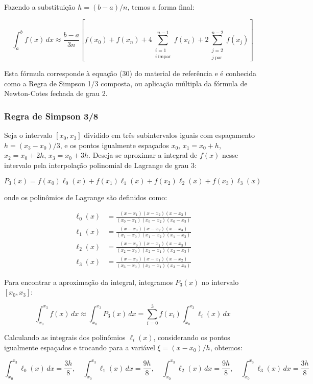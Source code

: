 \documentclass[12pt]{article}
\begin{document}
Fazendo a substituição $h = (b - a)/n$, temos a forma final:

\[
\int_a^b f(x)\,dx \approx \frac{b - a}{3n} \left[
f(x_0) + f(x_n)
+ 4 \sum_{\substack{i = 1 \\ i\ \text{ímpar}}}^{n-1} f(x_i)
+ 2 \sum_{\substack{j = 2 \\ j\ \text{par}}}^{n-2} f(x_j)
\right]
\]

Esta fórmula corresponde à equação (30) do material de referência e é conhecida como a Regra de Simpson 1/3 composta, ou aplicação múltipla da fórmula de Newton-Cotes fechada de grau 2.

\subsubsection*{Regra de Simpson 3/8}

Seja o intervalo $[x_0, x_3]$ dividido em três subintervalos iguais com espaçamento $h = (x_3 - x_0)/3$, e os pontos igualmente espaçados $x_0$, $x_1 = x_0 + h$, $x_2 = x_0 + 2h$, $x_3 = x_0 + 3h$. Deseja-se aproximar a integral de $f(x)$ nesse intervalo pela interpolação polinomial de Lagrange de grau 3:

\[
P_3(x) = f(x_0) \ell_0(x) + f(x_1) \ell_1(x) + f(x_2) \ell_2(x) + f(x_3) \ell_3(x)
\]

onde os polinômios de Lagrange são definidos como:

\begin{align*}
\ell_0(x) &= \frac{(x - x_1)(x - x_2)(x - x_3)}{(x_0 - x_1)(x_0 - x_2)(x_0 - x_3)} \\
\ell_1(x) &= \frac{(x - x_0)(x - x_2)(x - x_3)}{(x_1 - x_0)(x_1 - x_2)(x_1 - x_3)} \\
\ell_2(x) &= \frac{(x - x_0)(x - x_1)(x - x_3)}{(x_2 - x_0)(x_2 - x_1)(x_2 - x_3)} \\
\ell_3(x) &= \frac{(x - x_0)(x - x_1)(x - x_2)}{(x_3 - x_0)(x_3 - x_1)(x_3 - x_2)}
\end{align*}

Para encontrar a aproximação da integral, integramos $P_3(x)$ no intervalo $[x_0, x_3]$:

\[
\int_{x_0}^{x_3} f(x)\, dx \approx \int_{x_0}^{x_3} P_3(x)\, dx = \sum_{i=0}^{3} f(x_i) \int_{x_0}^{x_3} \ell_i(x)\, dx
\]

Calculando as integrais dos polinômios $\ell_i(x)$, considerando os pontos igualmente espaçados e trocando para a variável $\xi = (x - x_0)/h$, obtemos:

\[
\int_{x_0}^{x_3} \ell_0(x)\, dx = \frac{3h}{8}, \quad
\int_{x_0}^{x_3} \ell_1(x)\, dx = \frac{9h}{8}, \quad
\int_{x_0}^{x_3} \ell_2(x)\, dx = \frac{9h}{8}, \quad
\int_{x_0}^{x_3} \ell_3(x)\, dx = \frac{3h}{8}
\]
\end{document}
